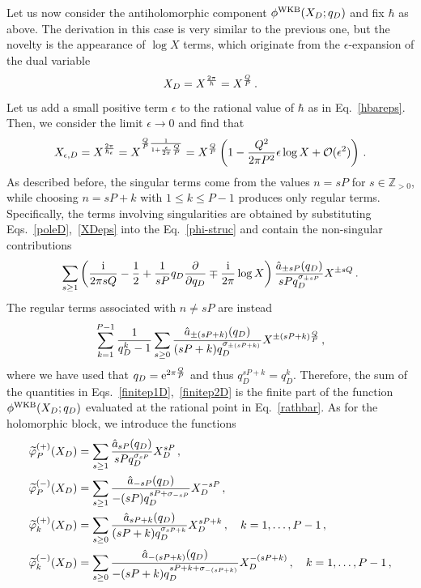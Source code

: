 \documentclass[a4paper,11pt]{article}
\theoremstyle{definition}
\newcommand{\CO}{{\cal O}}
\def\IZ{{\mathbb Z}}
\def\e{\epsilon}
\newcommand{\re}{{\rm e}}
\newcommand{\ri}{{\rm i}}
\newcommand{\be}{\begin{equation}}
\newcommand{\ee}{\end{equation}}
\begin{document}
Let us now consider the antiholomorphic component $\phi^{\rm WKB} (X_D; q_D)$ and fix $\hbar$ as above. The derivation in this case is very similar to the previous one, but the novelty is the appearance of $\log X$ terms, which originate from the $\epsilon$-expansion of the dual variable 
\be
X_D=X^{2 \pi \over \hbar}=X^{Q \over P} \, .
\ee 
Let us add a small positive term $\e$ to the rational value of $\hbar$ as in Eq.~\eqref{hbareps}.
Then, we consider the limit $\e \rightarrow 0$ and find that
%
\be \label{XDeps}
X_{\e,D}=X^{2 \pi \over \hbar_{\e}}=X^{{Q \over P} {1 \over 1+ {\epsilon \over 2 \pi} {Q \over P}}}= X^{Q\over P} \left( 1 -{Q^2  \over 2 \pi P^2} \e \log X +  \CO(\e^2) \right) \, .
\ee
%
As described before, the singular terms come from the values $n = sP$ for $s \in \IZ_{>0}$, while choosing $n= sP+k$ with $1 \le k \le P-1$ produces only regular terms.
Specifically, the terms involving singularities are obtained by substituting Eqs.~\eqref{poleD},~\eqref{XDeps} into the Eq.~\eqref{phi-struc} and contain the non-singular contributions
%
\be \label{finitep1D}
\sum_{s \ge 1} \left( \frac{\ri}{2 \pi sQ}-{1\over 2} +{1\over  sP} q_D {\partial \over \partial q_D} \mp \frac{\ri}{2 \pi} \log X \right) \frac{ \hat a_{\pm s P} (q_D) }{s P q_D^{\sigma_{\pm sP}}} X^{\pm sQ} \, .
\ee
%
The regular terms associated with $n \ne sP$ are instead 
%
\be \label{finitep2D}
\sum_{k=1}^{P-1} \frac{1}{q_D^k-1} \sum_{s \ge 0} {\hat a_{\pm (s P +k)} (q_D) \over (sP+k) q_D^{\sigma_{\pm (sP+k)}}} X^{\pm (sP+k){Q \over P}} \, ,
\ee
%
where we have used that $q_D=\re^{2 \pi {Q \over P}}$ and thus $q_D^{sP+k}= q_D^k$. 
Therefore, the sum of the quantities in Eqs.~\eqref{finitep1D},~\eqref{finitep2D} is the finite part of the function $\phi^{\rm WKB}(X_D;q_D)$ evaluated at the rational point in Eq.~\eqref{rathbar}.
As for the holomorphic block, we introduce the functions 
%
\begin{subequations} \label{phitildefunct-parts}
\begin{align}
\widetilde \varphi^{(+)}_P(X_D)&= \sum_{s \ge 1} {\hat a_{s P} (q_D) \over sP q_D^{\sigma_{sP}}} X_D^{sP}  \, ,\\
\widetilde \varphi^{(-)}_P(X_D)&= \sum_{s \ge 1} {\hat a_{-s P} (q_D) \over -(sP) q_D^{sP+\sigma_{-sP}}} X_D^{-sP}  \, ,\\
\widetilde \varphi^{(+)}_k(X_D)&=  \sum_{s \ge 0} {\hat a_{s P +k} (q_D) \over (sP+k) q_D^{\sigma_{sP+k}}} X_D^{sP+k}  \, , \quad k=1, \dots, P-1 \, , \\
\widetilde \varphi^{(-)}_k(X_D)&=  \sum_{s \ge 0} {\hat a_{-(s P +k)} (q_D) \over -(sP+k) q_D^{sP+k+\sigma_{-(sP+k)}}} X_D^{-(sP+k)}  \, , \quad k=1, \dots, P-1 \, , 
\end{align}
\end{subequations}
\end{document}
